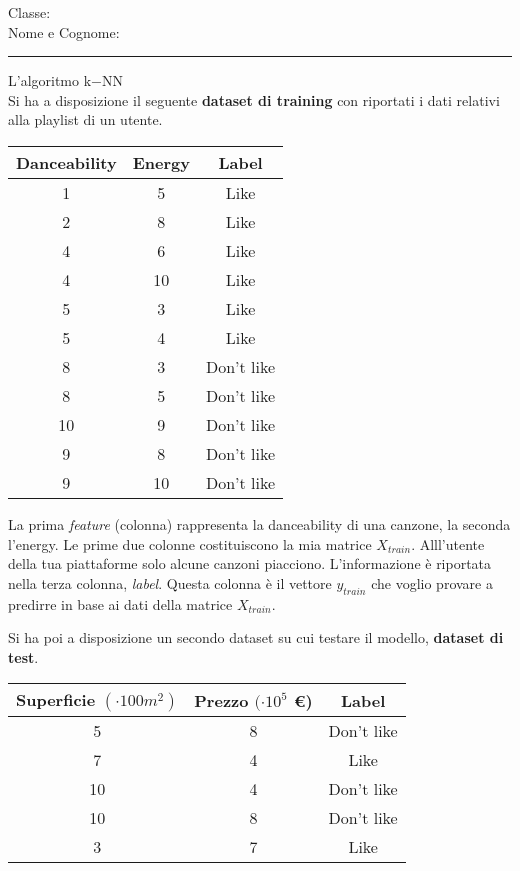 \documentclass{exam}
\begin{document}

\noindent Classe:\\
Nome e Cognome:


\noindent \rule{\textwidth}{0.4pt}
\Large{L'algoritmo k$-$NN}\\
\normalsize
Si ha a disposizione il seguente \textbf{dataset di training} con riportati i dati relativi alla playlist di un utente.\\

\begin{small}
\begin{tabular}{|c|c|c|}
\hline
Danceability & Energy  & Label\\ \hline
1 & 5 & Like \\
2 & 8 & Like\\
4 & 6 &  Like\\
4 & 10 &  Like\\
5 & 3 &  Like\\
5 & 4 &  Like\\
8 & 3 & Don't like\\
8 & 5 & Don't like\\
10 & 9 & Don't like\\
9 & 8 & Don't like\\
9 & 10 & Don't like\\
\hline
\end{tabular}
\end{small}

La prima \textit{feature} (colonna) rappresenta la danceability di una canzone, la seconda l'energy. Le prime due colonne costituiscono la mia matrice $X_{train}$.
Alll'utente della tua piattaforme solo alcune canzoni piacciono. L'informazione è riportata nella terza colonna, \textit{label}. Questa colonna è il vettore $y_{train}$ che voglio provare a predirre in base ai dati della matrice $X_{train}$.
 
Si ha poi a disposizione un secondo dataset su cui testare il modello, \textbf{dataset di test}.  \\

\begin{small}
\begin{tabular}{|c|c|c|}
\hline
Superficie $(\cdot 100 m^2)$ &Prezzo $(\cdot 10^5$ \euro) & Label\\ \hline
5 & 8 & Don't like \\
7 & 4 &  Like\\
10 & 4 &  Don't like\\
10 & 8 &  Don't like\\
3 & 7 & Like\\
\hline
\end{tabular}
\end{small}
\end{document}
